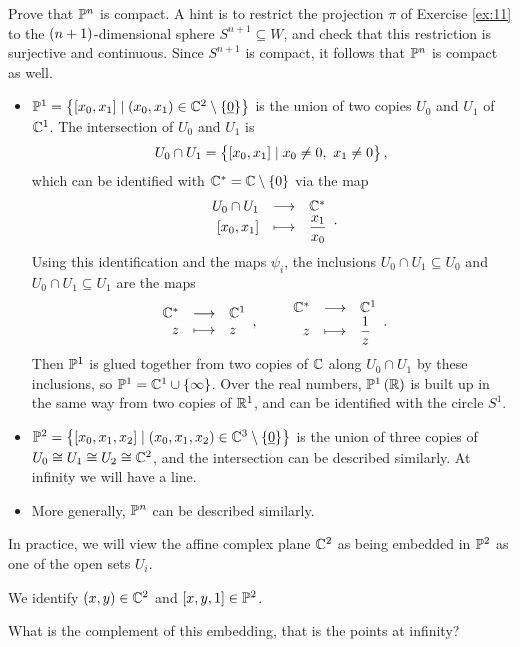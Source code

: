 \begin{exercise}
\label{ex:12}
Prove that $ \P^n $ is compact. A hint is to restrict the projection $ \pi $ of Exercise \ref{ex:11} to the $ \br{n + 1} $-dimensional sphere $ S^{n + 1} \subseteq W $, and check that this restriction is surjective and continuous. Since $ S^{n + 1} $ is compact, it follows that $ \P^n $ is compact as well.
\end{exercise}

\pagebreak

\begin{example}
\hfill
\begin{itemize}
\item $ \P^1 = \cbr{\sbr{x_0, x_1} \mid \br{x_0, x_1} \in \C^2 \setminus \cbr{\underline{0}}} $ is the union of two copies $ U_0 $ and $ U_1 $ of $ \C^1 $. The intersection of $ U_0 $ and $ U_1 $ is
$$ U_0 \cap U_1 = \cbr{\sbr{x_0, x_1} \mid x_0 \ne 0, \ x_1 \ne 0}, $$
which can be identified with $ \C^* = \C \setminus \cbr{0} $ via the map
$$ \function{U_0 \cap U_1}{\C^*}{\sbr{x_0, x_1}}{\dfrac{x_1}{x_0}}. $$
Using this identification and the maps $ \psi_i $, the inclusions $ U_0 \cap U_1 \subseteq U_0 $ and $ U_0 \cap U_1 \subseteq U_1 $ are the maps
$$ \function{\C^*}{\C^1}{z}{z}, \qquad \function{\C^*}{\C^1}{z}{\dfrac{1}{z}}. $$
Then $ \P^1 $ is glued together from two copies of $ \C $ along $ U_0 \cap U_1 $ by these inclusions, so $ \P^1 = \C^1 \cup \cbr{\infty} $. Over the real numbers, $ \P^1\br{\R} $ is built up in the same way from two copies of $ \R^1 $, and can be identified with the circle $ S^1 $.
\item $ \P^2 = \cbr{\sbr{x_0, x_1, x_2} \mid \br{x_0, x_1, x_2} \in \C^3 \setminus \cbr{\underline{0}}} $ is the union of three copies of $ U_0 \cong U_1 \cong U_2 \cong \C^2 $, and the intersection can be described similarly. At infinity we will have a line.
\item More generally, $ \P^n $ can be described similarly.
\end{itemize}
\end{example}

In practice, we will view the affine complex plane $ \C^2 $ as being embedded in $ \P^2 $ as one of the open sets $ U_i $.

\begin{example*}
We identify $ \br{x, y} \in \C^2 $ and $ \sbr{x, y, 1} \in \P^2 $.
\end{example*}

What is the complement of this embedding, that is the points at infinity?

